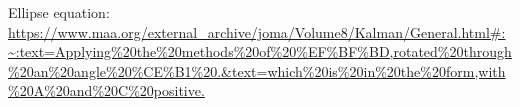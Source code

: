 \begin{thebibliography}{9}

Ellipse equation:
\url{https://www.maa.org/external_archive/joma/Volume8/Kalman/General.html#:~:text=Applying%20the%20methods%20of%20%EF%BF%BD,rotated%20through%20an%20angle%20%CE%B1%20.&text=which%20is%20in%20the%20form,with%20A%20and%20C%20positive.}

\end{thebibliography}
